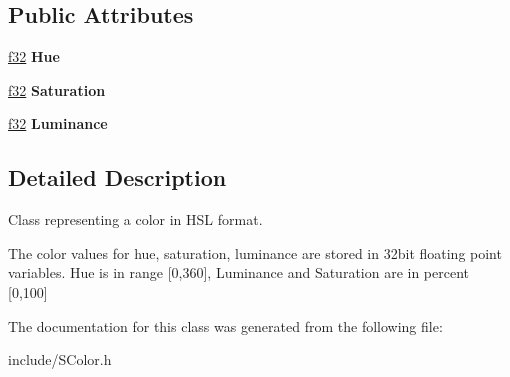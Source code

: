 \subsection*{Public Attributes}
\begin{DoxyCompactItemize}
\item 
\hyperlink{namespaceirr_a0277be98d67dc26ff93b1a6a1d086b07}{f32} {\bfseries Hue}\hypertarget{classirr_1_1video_1_1SColorHSL_a76d317e46d5a30982ed3da58401d319f}{}\label{classirr_1_1video_1_1SColorHSL_a76d317e46d5a30982ed3da58401d319f}

\item 
\hyperlink{namespaceirr_a0277be98d67dc26ff93b1a6a1d086b07}{f32} {\bfseries Saturation}\hypertarget{classirr_1_1video_1_1SColorHSL_a61a3b30e3a7724ec9d091001e411987e}{}\label{classirr_1_1video_1_1SColorHSL_a61a3b30e3a7724ec9d091001e411987e}

\item 
\hyperlink{namespaceirr_a0277be98d67dc26ff93b1a6a1d086b07}{f32} {\bfseries Luminance}\hypertarget{classirr_1_1video_1_1SColorHSL_acc584a689cf0e4a312c07d58f2a9f2b4}{}\label{classirr_1_1video_1_1SColorHSL_acc584a689cf0e4a312c07d58f2a9f2b4}

\end{DoxyCompactItemize}


\subsection{Detailed Description}
Class representing a color in H\+SL format. 

The color values for hue, saturation, luminance are stored in 32bit floating point variables. Hue is in range \mbox{[}0,360\mbox{]}, Luminance and Saturation are in percent \mbox{[}0,100\mbox{]} 

The documentation for this class was generated from the following file\+:\begin{DoxyCompactItemize}
\item 
include/S\+Color.\+h\end{DoxyCompactItemize}
